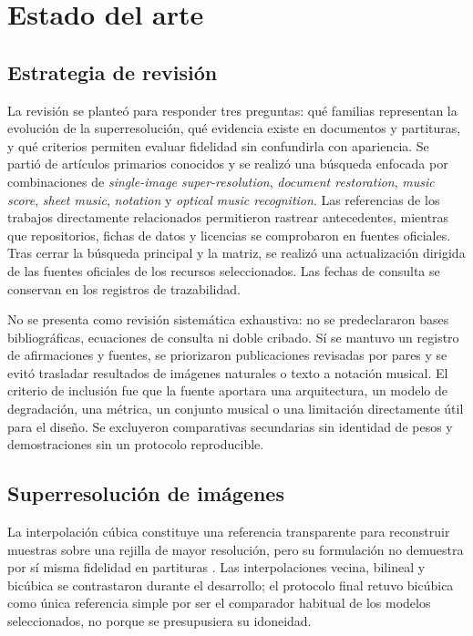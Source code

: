 \chapter{Estado del arte}

\section{Estrategia de revisión}
La revisión se planteó para responder tres preguntas: qué familias representan la evolución de la
superresolución, qué evidencia existe en documentos y partituras, y qué criterios permiten evaluar
fidelidad sin confundirla con apariencia. Se partió de artículos primarios conocidos y se realizó
una búsqueda enfocada por combinaciones de \emph{single-image super-resolution}, \emph{document
restoration}, \emph{music score}, \emph{sheet music}, \emph{notation} y \emph{optical music
recognition}. Las referencias de los trabajos directamente relacionados permitieron rastrear
antecedentes, mientras que repositorios, fichas de datos y licencias se comprobaron en fuentes
oficiales. Tras cerrar la búsqueda principal y la matriz, se realizó una actualización dirigida
de las fuentes oficiales de los recursos seleccionados. Las fechas de consulta se conservan en
los registros de trazabilidad.

No se presenta como revisión sistemática exhaustiva: no se predeclararon bases bibliográficas,
ecuaciones de consulta ni doble cribado. Sí se mantuvo un registro de afirmaciones y fuentes, se
priorizaron publicaciones revisadas por pares y se evitó trasladar resultados de imágenes naturales
o texto a notación musical. El criterio de inclusión fue que la fuente aportara una arquitectura,
un modelo de degradación, una métrica, un conjunto musical o una limitación directamente útil para
el diseño. Se excluyeron comparativas secundarias sin identidad de pesos y demostraciones sin un
protocolo reproducible.

\section{Superresolución de imágenes}
La interpolación cúbica constituye una referencia transparente para reconstruir muestras sobre una
rejilla de mayor resolución, pero su formulación no demuestra por sí misma fidelidad en partituras
\cite{keys1981cubic}. %
Las interpolaciones vecina, bilineal y bicúbica se contrastaron durante el desarrollo; el protocolo
final retuvo bicúbica como única referencia simple por ser el comparador habitual de los modelos
seleccionados, no porque se presupusiera su idoneidad.

